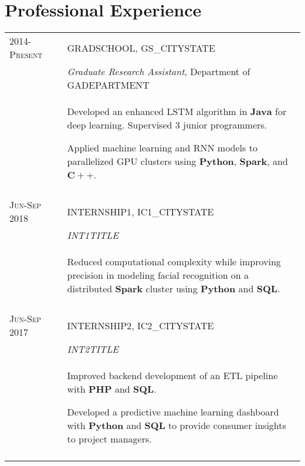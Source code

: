 \documentclass[a4paper,10pt]{article}
\begin{document}
\section{Professional Experience}
\begin{supertabular}{l p{0.55cm} p{13.9cm}}
	\textsc{2014-Present}				&& \textsc{GRADSCHOOL}, GS_CITYSTATE \\
	\small\textsc{}							&& \small	\emph{Graduate Research Assistant}, \small Department of GADEPARTMENT \\
															&& \begin{enumerate*}[label =$\diamond$,itemjoin={\newline}]
																	\item \footnotesize Developed an enhanced LSTM algorithm in $\mathbf{Java}$ for deep learning. Supervised 3 junior programmers.
																	\item \footnotesize Applied machine learning and RNN models to parallelized GPU clusters using $\mathbf{Python}$, $\mathbf{Spark}$, and $\mathbf{C++}$.
																	\end{enumerate*} \vspace{2mm} \\

	 \\

	\textsc{Jun-Sep 2018}	&& \textsc{INTERNSHIP1}, IC1_CITYSTATE \\
												&& \small	\emph{INT1TITLE} \\
												&& \begin{enumerate*}[label =$\diamond$, itemjoin={\newline}]
														\item \footnotesize Reduced computational complexity while improving precision in modeling facial recognition on a distributed $\mathbf{Spark}$ cluster using $\mathbf{Python}$ and $\mathbf{SQL}$.	\end{enumerate*} \\
	 \\




	\textsc{Jun-Sep 2017}	&& \textsc{INTERNSHIP2}, IC2_CITYSTATE \\
												&& \small	\emph{INT2TITLE} \\
												&& \begin{enumerate*}[label =$\diamond$, itemjoin={\newline}]
														\item \footnotesize Improved backend development of an ETL pipeline with $\mathbf{PHP}$ and $\mathbf{SQL}$.
														\item \footnotesize Developed a predictive machine learning dashboard with $\mathbf{Python}$ and $\mathbf{SQL}$ to provide consumer insights to project managers. \end{enumerate*} \\
	 \\




\end{supertabular}
\end{document}
